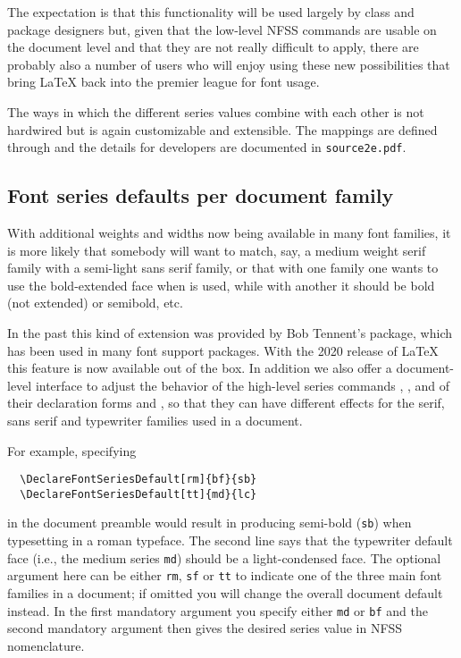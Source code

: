 \documentclass{ltnews}
\begin{document}
The expectation is that this functionality will be used largely by
class and package designers but, given that the low-level NFSS
commands are usable on the document level and that they are not really
difficult to apply, there are probably also a number of users who will
enjoy using these new possibilities that bring \LaTeX{} back into the
premier league for font usage.

The ways in which the different series values combine with each other is not
hardwired but is again customizable and extensible. The mappings are
defined through  and the details for
developers are documented in \texttt{source2e.pdf}.


\subsection{Font series defaults per document family}

With additional weights and widths now being available in
many font families, it is more likely that somebody will want to
match, say, a medium weight serif family with a semi-light sans serif
family, or that with one family one wants to use the bold-extended
face when  is used, while with another it should be bold
(not extended) or semibold, etc.

In the past this kind of extension was provided by Bob Tennent's
 package, which has been used in many font
support packages.
With the 2020 release of \LaTeX{} this feature is now available out
of the box.  In addition we also offer a document-level interface to adjust the
behavior of the high-level series commands , , and of their
declaration forms  and , so that they can
have different effects for the serif, sans serif and typewriter
families used in a document.

For example, specifying
\begin{verbatim}
  \DeclareFontSeriesDefault[rm]{bf}{sb}
  \DeclareFontSeriesDefault[tt]{md}{lc}
\end{verbatim}
in the document preamble would result in  producing
semi-bold (\texttt{sb}) when typesetting in a roman typeface.
The second line says that the
typewriter default face (i.e., the medium series \texttt{md}) should be
a light-condensed face. The optional argument here can be either
\texttt{rm}, \texttt{sf} or \texttt{tt} to indicate one of the three
main font families in a document; if omitted you will change the
overall document default instead.  In the first mandatory argument you
specify either \texttt{md} or \texttt{bf} and the second mandatory
argument then gives the desired series value in NFSS nomenclature.
\end{document}
